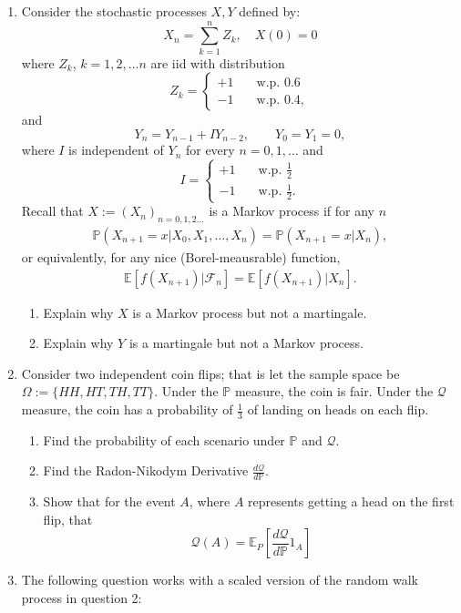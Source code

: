 \documentclass[11pt]{article}
\newcommand{\E}{\mathbb{E}}
\newcommand{\PR}{\mathbb{P}}
\renewcommand{\Pr}{\mathbb{P}}
\newcommand{\Q}{\mathcal{Q}}
\begin{document}
\begin{enumerate}
		\item Consider the stochastic processes \( X, Y \) defined by:
		\[	X_n = \sum_{k=1}^{n}Z_{k},\quad X(0) = 0
		\]
		where $Z_{k}$, $k=1,2,...n$ are iid with distribution 
		\[	Z_{k} = \begin{cases}
			+1 &  \quad \text{w.p. } 0.6 \\
			-1 & \quad \text{w.p. } 0.4,
		\end{cases}
		\]
		and 
		\[
		Y_n = Y_{n-1} + IY_{n-2},\qquad Y_0 = Y_1 = 0,
		\]
		where \( I \) is independent of \( Y_n \) for every \( n=0,1,\ldots \) and 
		\[
		I = \begin{cases}
			+1 &  \quad \text{w.p. } \frac{1}{2} \\
			-1 & \quad \text{w.p. } \frac{1}{2}.
		\end{cases}
		\]
		Recall that \( X:=(X_n)_{n=0,1,2\ldots} \) is a Markov process if for any \( n \)
		\begin{align*}
			\Pr(X_{n+1} = x| X_0, X_1, \ldots, X_n) = \Pr(X_{n+1} = x | X_n),
		\end{align*}
		or equivalently, for any nice (Borel-meausrable) function,
		\begin{align*}
			\E[f(X_{n+1})|\mathcal{F}_n] = \E[f(X_{n+1}) | X_n].
		\end{align*}
		\begin{enumerate}
			\item Explain why \( X \) is a Markov process but not a martingale.
			\item Explain why \( Y \) is a martingale but not a Markov process.
		\end{enumerate}
		\item Consider two independent coin flips; that is let the sample space be $\Omega:=\{HH, HT, TH, TT\}$. Under the $\PR$ measure, the coin is fair. Under the $\Q$ measure, the coin has a probability of $\frac{1}{3}$ of landing on heads on each flip. 
		\begin{enumerate}
			\item Find the probability of each scenario under $\PR$ and $\Q$.
			\item Find the Radon-Nikodym Derivative $\frac{d\Q}{d\PR}$.
			\item Show that for the event $A$, where $A$ represents getting a head on the first flip, that
			\[	\Q(A) = \E_{P}\left[\frac{d\Q}{d\PR}1_{A}\right]
			\]
		\end{enumerate}
		\item The following question works with a scaled version of the random walk process in question 2:

\end{enumerate}
\end{document}

